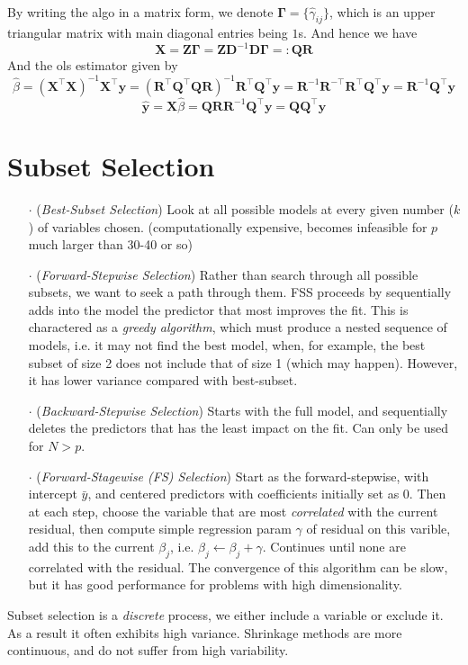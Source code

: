 \documentclass[a4paper, 11pt]{article}
\begin{document}
\begin{itemize}
	~\\
	By writing the algo in a matrix form, we denote $\bm{\Gamma}=\{\hat{\gamma}_{ij}\}$, which is an upper triangular matrix with main diagonal entries being $1$s. And hence we have
	$$
	\bm{X} = \bm{Z\Gamma} = \bm{ZD}^{-1} \bm{D\Gamma} =: \bm{QR}
	$$
	And the ols estimator given by
	$$
	\hat{\beta} = (\bm{X}^{\top}\bm{X})^{-1} \bm{X}^{\top} \bm{y} = (\bm{R}^{\top}\bm{Q}^{\top}\bm{QR})^{-1} \bm{R}^{\top} \bm{Q}^{\top} \bm{y} = \bm{R}^{-1} \bm{R}^{-\top} \bm{R}^{\top} \bm{Q}^{\top} \bm{y} = \bm{R}^{-1} \bm{Q}^{\top} \bm{y}
	$$
	$$
	\hat{\bm{y}} = \bm{X}\hat{\beta} = \bm{QR}\bm{R}^{-1} \bm{Q}^{\top} \bm{y} = \bm{Q}\bm{Q}^{\top} \bm{y}
	$$
\end{itemize}


\section{Subset Selection}
\begin{itemize}
	\item[$\cdot$] (\emph{Best-Subset Selection}) Look at all possible models at every given number ($k$) of variables chosen. (computationally expensive, becomes infeasible for $p$ much larger than 30-40 or so)
	\item[$\cdot$] (\emph{Forward-Stepwise Selection}) Rather than search through all possible subsets, we want to seek a path through them. FSS proceeds by sequentially adds into the model the predictor that most improves the fit. This is charactered as a \emph{greedy algorithm}, which must produce a nested sequence of models, i.e. it may not find the best model, when, for example, the best subset of size 2 does not include that of size 1 (which may happen). However, it has lower variance compared with best-subset.
	\item[$\cdot$] (\emph{Backward-Stepwise Selection}) Starts with the full model, and sequentially deletes the predictors that has the least impact on the fit. Can only be used for $N>p$. 
	\item[$\cdot$] (\emph{Forward-Stagewise (FS) Selection}) Start as the forward-stepwise, with intercept $\bar{y}$, and centered predictors with coefficients initially set as $0$. Then at each step, choose the variable that are most \emph{correlated} with the current residual, then compute simple regression param $\gamma$ of residual on this varible, add this to the current $\beta_j$, i.e. $\beta_j \leftarrow \beta_j + \gamma$. Continues until none are correlated with the residual. The convergence of this algorithm can be slow, but it has good performance for problems with high dimensionality.
\end{itemize}
Subset selection is a \emph{discrete} process, we either include a variable or exclude it. As a result it often exhibits high variance. Shrinkage methods are more continuous, and do not suffer from high variability.
\end{document}
